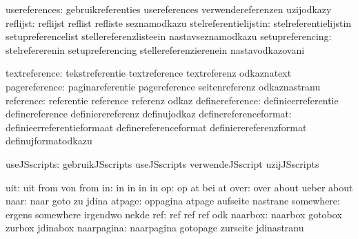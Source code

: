                usereferences:  gebruikreferenties           usereferences
                                verwendereferenzen           uzijodkazy
                     reflijst:  reflijst                     reflist
                                refliste                     seznamodkazu
        stelreferentielijstin:  stelreferentielijstin        setupreferencelist
                                stellereferenzlisteein       nastavseznamodkazu
             setupreferencing:  stelrefererenin              setupreferencing
                                stellereferenzierenein       nastavodkazovani

                textreference:  tekstreferentie              textreference
                                textreferenz                 odkaznatext
                pagereference:  paginareferentie             pagereference
                                seitenreferenz               odkaznastranu
                    reference:  referentie                   reference
                                referenz                     odkaz
              definereference:  definieerreferentie          definereference
                                definierereferenz            definujodkaz
        definereferenceformat:  definieerreferentieformaat   definereferenceformat
                                definierereferenzformat      definujformatodkazu

                 useJSscripts:  gebruikJSscripts             useJSscripts
                                verwendeJSscript             uzijJSscripts

                          uit:  uit                          from
                                von                          from  %
                           in:  in                           in
                                in                           in    %
                           op:  op                           at
                                bei                          at    %
                         over:  over                         about
                                ueber                        about %
                         naar:  naar                         goto
                                zu                           jdina
                       atpage:  oppagina                     atpage
                                aufseite                     nastrane
                    somewhere:  ergens                       somewhere
                                irgendwo                     nekde
                          ref:  ref                          ref
                                ref                          odk %
                      naarbox:  naarbox                      gotobox
                                zurbox                       jdinabox
                   naarpagina:  naarpagina                   gotopage
                                zurseite                     jdinastranu

